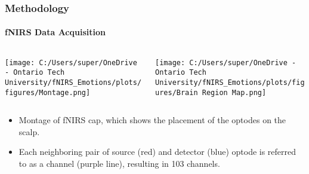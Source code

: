 \documentclass{beamer}
\begin{document}
\begin{frame}
    \frametitle{Methodology}
    \framesubtitle{fNIRS Data Acquisition}
    \begin{columns}
        \begin{column}{0.65\textwidth}
            \centering
            \texttt{[image: C:/Users/super/OneDrive - Ontario Tech University/fNIRS\_Emotions/plots/figures/Montage.png]}
        \end{column}
        \begin{column}{0.34\textwidth}
            \centering
            \texttt{[image: C:/Users/super/OneDrive - Ontario Tech University/fNIRS\_Emotions/plots/figures/Brain Region Map.png]}
        \end{column}
    \end{columns}
    \begin{itemize}
        \small
        \item Montage of fNIRS cap, which shows the placement of the optodes on the scalp.
        \item Each neighboring pair of source (red) and detector (blue) optode is referred to as a channel (purple line), resulting in 103 channels.
    \end{itemize}
\end{frame}
\end{document}
